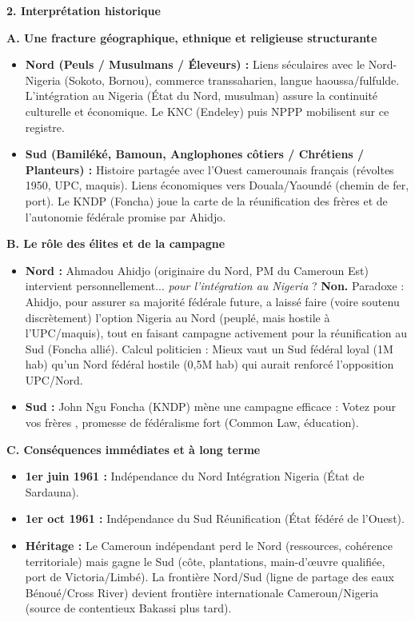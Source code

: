 \documentclass[11pt]{article}
\newcommand{\cle}[1]{{\popxbold\color{popdark}#1}}
\begin{document}
\begin{exoresolu}
\textbf{2. Interprétation historique}

\textbf{A. Une fracture géographique, ethnique et religieuse structurante}
\begin{itemize}
    \item \textbf{Nord (Peuls / Musulmans / Éleveurs) :} Liens séculaires avec le Nord-Nigeria (Sokoto, Bornou), commerce transsaharien, langue haoussa/fulfulde. L'intégration au Nigeria (État du Nord, musulman) assure la continuité culturelle et économique. Le KNC (Endeley) puis NPPP mobilisent sur ce registre.
    \item \textbf{Sud (Bamiléké, Bamoun, Anglophones côtiers / Chrétiens / Planteurs) :} Histoire partagée avec l'Ouest camerounais français (révoltes 1950, UPC, maquis). Liens économiques vers Douala/Yaoundé (chemin de fer, port). Le KNDP (Foncha) joue la carte de la \cle{réunification des frères} et de l'autonomie fédérale promise par Ahidjo.
\end{itemize}

\textbf{B. Le rôle des élites et de la campagne}
\begin{itemize}
    \item \textbf{Nord :} \cle{Ahmadou Ahidjo} (originaire du Nord, PM du Cameroun Est) intervient personnellement... \emph{pour l'intégration au Nigeria} ? \textbf{Non.} Paradoxe : Ahidjo, pour assurer sa majorité fédérale future, a \cle{laissé faire} (voire soutenu discrètement) l'option Nigeria au Nord (peuplé, mais hostile à l'UPC/maquis), tout en faisant campagne activement pour la réunification au Sud (Foncha allié). Calcul politicien : Mieux vaut un Sud fédéral loyal (1M hab) qu'un Nord fédéral hostile (0,5M hab) qui aurait renforcé l'opposition UPC/Nord.
    \item \textbf{Sud :} \cle{John Ngu Foncha} (KNDP) mène une campagne efficace : \guillemotleft Votez pour vos frères \guillemotright, promesse de fédéralisme fort (Common Law, éducation).
\end{itemize}

\textbf{C. Conséquences immédiates et à long terme}
\begin{itemize}
    \item \textbf{1er juin 1961 :} Indépendance du Nord \rightarrow Intégration Nigeria (État de Sardauna).
    \item \textbf{1er oct 1961 :} Indépendance du Sud \rightarrow Réunification (État fédéré de l'Ouest).
    \item \textbf{Héritage :} Le Cameroun indépendant \cle{perd le Nord} (ressources, cohérence territoriale) mais \cle{gagne le Sud} (côte, plantations, main-d'œuvre qualifiée, port de Victoria/Limbé). La frontière Nord/Sud (ligne de partage des eaux Bénoué/Cross River) devient frontière internationale Cameroun/Nigeria (source de contentieux Bakassi plus tard).
\end{itemize}


\end{exoresolu}
\end{document}
